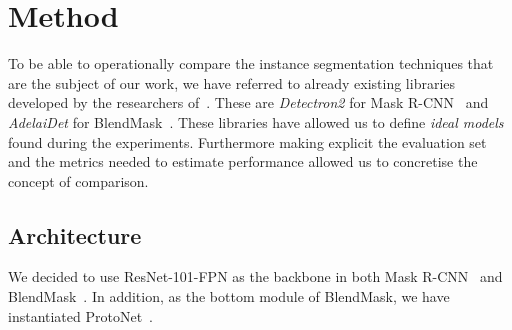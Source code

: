 \documentclass[10pt,twocolumn,letterpaper]{article}
\begin{document}
\section{Method}
To be able to operationally compare the instance segmentation techniques that are the subject of our work, we have referred to already existing libraries developed by the researchers of~\cite{Authors1_maskrcnn, Authors2_BlendMask}. These are \textit{Detectron2} for Mask R-CNN~\cite{Authors1_maskrcnn} and \textit{AdelaiDet} for BlendMask~\cite{Authors2_BlendMask}.
These libraries have allowed us to define \textit{ideal models} found during the experiments. Furthermore making explicit the evaluation set and the metrics needed to estimate performance allowed us to concretise the concept of comparison.

\subsection{Architecture}
We decided to use ResNet-101-FPN as the backbone in both Mask R-CNN~\cite{Authors1_maskrcnn} and BlendMask~\cite{Authors2_BlendMask}. In addition, as the bottom module of BlendMask, we have instantiated ProtoNet~\cite{protonet}.
\end{document}
